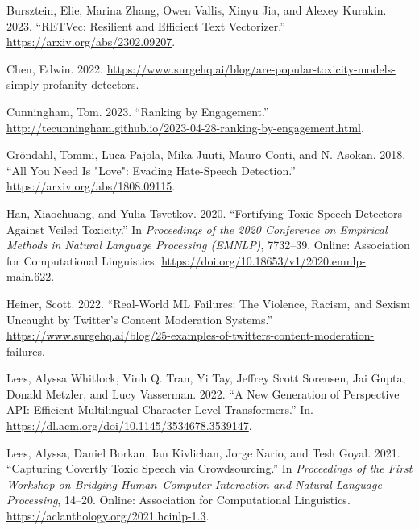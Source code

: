 \documentclass[
  10pt,
  ignorenonframetext,
]{beamer}
\newlength{\cslhangindent}
\newenvironment{CSLReferences}[2] %
 {\begin{list}{}{%
  \setlength{\itemindent}{0pt}
  \setlength{\leftmargin}{0pt}
  \setlength{\parsep}{0pt}
  \ifodd #1
   \setlength{\leftmargin}{\cslhangindent}
   \setlength{\itemindent}{-1\cslhangindent}
  \fi
  \setlength{\itemsep}{#2\baselineskip}}}
 {\end{list}}
\begin{document}
\begin{frame}{}
\label{section-14}
\label{refs}
\begin{CSLReferences}{1}{0}
Bursztein, Elie, Marina Zhang, Owen Vallis, Xinyu Jia, and Alexey
Kurakin. 2023. {``RETVec: Resilient and Efficient Text Vectorizer.''}
\url{https://arxiv.org/abs/2302.09207}.

Chen, Edwin. 2022.
\url{https://www.surgehq.ai/blog/are-popular-toxicity-models-simply-profanity-detectors}.

Cunningham, Tom. 2023. {``Ranking by Engagement.''}
\url{http://tecunningham.github.io/2023-04-28-ranking-by-engagement.html}.

Gröndahl, Tommi, Luca Pajola, Mika Juuti, Mauro Conti, and N. Asokan.
2018. {``All You Need Is "Love": Evading Hate-Speech Detection.''}
\url{https://arxiv.org/abs/1808.09115}.

Han, Xiaochuang, and Yulia Tsvetkov. 2020. {``Fortifying Toxic Speech
Detectors Against Veiled Toxicity.''} In \emph{Proceedings of the 2020
Conference on Empirical Methods in Natural Language Processing (EMNLP)},
7732--39. Online: Association for Computational Linguistics.
\url{https://doi.org/10.18653/v1/2020.emnlp-main.622}.

Heiner, Scott. 2022. {``Real-World ML Failures: The Violence, Racism,
and Sexism Uncaught by Twitter's Content Moderation Systems.''}
\url{https://www.surgehq.ai/blog/25-examples-of-twitters-content-moderation-failures}.

Lees, Alyssa Whitlock, Vinh Q. Tran, Yi Tay, Jeffrey Scott Sorensen, Jai
Gupta, Donald Metzler, and Lucy Vasserman. 2022. {``A New Generation of
Perspective API: Efficient Multilingual Character-Level Transformers.''}
In. \url{https://dl.acm.org/doi/10.1145/3534678.3539147}.

Lees, Alyssa, Daniel Borkan, Ian Kivlichan, Jorge Nario, and Tesh Goyal.
2021. {``Capturing Covertly Toxic Speech via Crowdsourcing.''} In
\emph{Proceedings of the First Workshop on Bridging Human{--}Computer
Interaction and Natural Language Processing}, 14--20. Online:
Association for Computational Linguistics.
\url{https://aclanthology.org/2021.hcinlp-1.3}.


\end{CSLReferences}
\end{frame}
\end{document}
